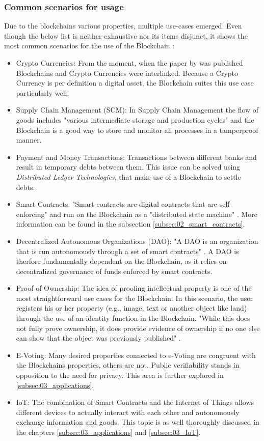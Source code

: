 \subsubsection{Common scenarios for usage}
Due to the blockchains various properties, multiple use-cases emerged. Even though the below list is neither exhaustive nor its items disjunct, it shows the most common scenarios for the use of the Blockchain \cite{Wust2017}:
\begin{itemize}
  \item Crypto Currencies: From the moment, when the paper by \citeauthor{Nakamoto2008} was published Blockchains and Crypto Currencies were interlinked. Because a Crypto Currency is per definition a digital asset, the Blockchain suites this use case particularly well.
  \item Supply Chain Management (SCM): In Supply Chain Management the flow of goods includes "various intermediate storage and production cycles" \cite{Wust2017} and the Blockchain is a good way to store and monitor all processes in a tamperproof manner.
  \item Payment and Money Transactions: Transactions between different banks and result in temporary debts between them. This issue can be solved using \textit{Distributed Ledger Technologies}, that make use of a Blockchain to settle debts. 
  \item  Smart Contracts: "Smart contracts are digital contracts that are self-enforcing" and run on the Blockchain as a "distributed state machine" \cite{Wust2017}. More information can be found in the subsection \ref{subsec:02_smart_contracts}.
  \item Decentralized Autonomous Organizations (DAO): "A DAO is an organization that is run autonomously through a set of smart contracts" \cite{Wust2017}. A DAO is therfore fundamentally dependent on the Blockchain, as it relies on decentralized governance of funds enforced by smart contracts.
  \item Proof of Ownership: The idea of proofing intellectual property is one of the most straightforward use cases for the Blockchain. In this scenario, the user registers his or her property (e.g., image, text or another object like land) through the use of an identity function in the Blockchain. "While this does not fully prove ownership, it does provide evidence of ownership if no one else can show that the object was previously published" \cite{Wust2017}.   
  \item E-Voting: Many desired properties connected to e-Voting are congruent with the Blockchains properties, others are not. Public verifiability stands in opposition to the need for privacy. This area is further explored in \ref{subsec:03_applications}.
  \item IoT: The combination of Smart Contracts and the Internet of Things allows different devices to actually interact with each other and autonomously exchange information and goods. This topic is as well thoroughly discussed in the chapters \ref{subsec:03_applications} and \ref{subsec:03_IoT}.
\end{itemize}

